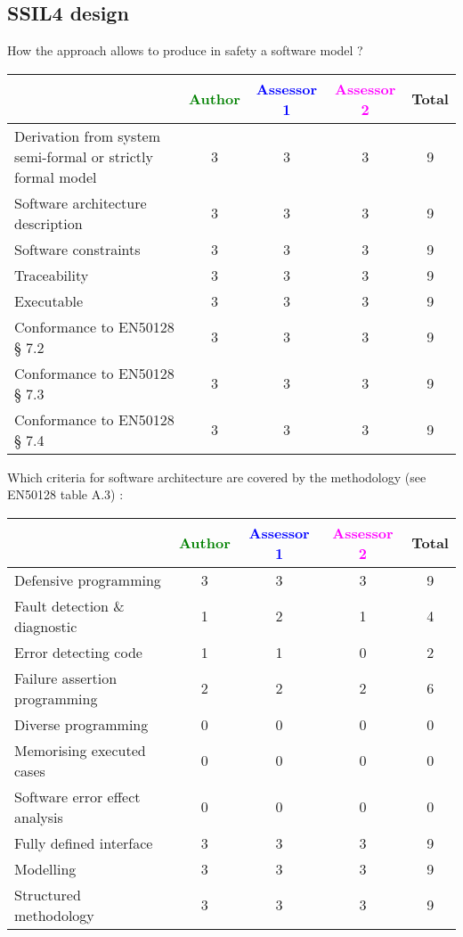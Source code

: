 \subsection{SSIL4 design}

How the approach allows to  produce in safety a software model ?

\begin{tabular}{|l | c | c | c | c|}
\hline
& \textcolor{green}{Author} & \textcolor{blue}{Assessor 1} & \textcolor{magenta}{Assessor 2} & Total \\
\hline
Derivation from system semi-formal or strictly formal model  & 3 & 3 & 3 & 9 \\
\hline 
Software architecture description  & 3 & 3 & 3 & 9 \\
\hline
Software constraints  & 3 & 3 & 3 & 9 \\
\hline
Traceability  & 3 & 3 & 3 & 9  \\
\hline
Executable  & 3 & 3 & 3 & 9 \\
\hline
Conformance to EN50128 § 7.2  & 3 & 3 & 3 & 9 \\
\hline
Conformance to EN50128 § 7.3  & 3 & 3 & 3 & 9 \\
\hline
Conformance to EN50128 § 7.4  & 3 & 3 & 3 & 9 \\
\hline
\end{tabular}

Which criteria for software architecture are covered by the methodology
(see EN50128 table A.3) :

\begin{tabular}{|l | c | c | c | c|}
\hline
& \textcolor{green}{Author} & \textcolor{blue}{Assessor 1} & \textcolor{magenta}{Assessor 2} & Total \\
\hline
Defensive programming  & 3 & 3 & 3 & 9 \\
\hline 
Fault detection \& diagnostic  & 1 & 2 & 1 & 4 \\
\hline
Error detecting code  & 1 & 1 & 0 & 2 \\
\hline
Failure assertion programming & 2  & 2 & 2 & 6 \\
\hline
Diverse programming & 0 & 0 & 0 & 0 \\
\hline
Memorising executed cases & 0 & 0 & 0 & 0 \\
\hline
Software error effect analysis & 0 & 0 & 0 & 0 \\
\hline
Fully defined interface & 3 & 3 & 3 & 9 \\
\hline
Modelling  & 3 & 3 & 3 & 9 \\
\hline
Structured methodology & 3 & 3 & 3 & 9 \\
\hline
\end{tabular}

